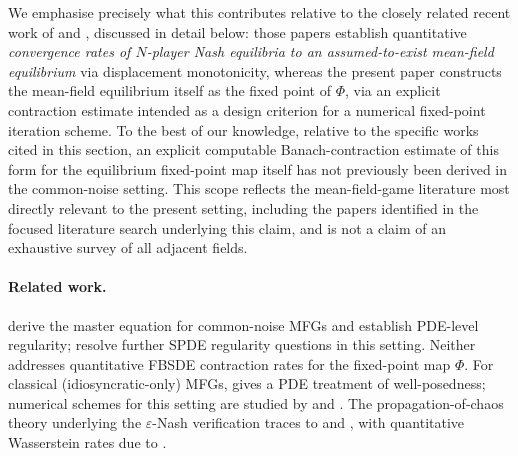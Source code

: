 \documentclass[11pt]{article}
\theoremstyle{remark}
\begin{document}
We emphasise precisely what this contributes relative to the closely related recent
work of \citet{jacksontangpi2024} and \citet{jacksonmeszaros2025}, discussed in detail
below: those papers establish quantitative \emph{convergence rates of $N$-player Nash
equilibria to an assumed-to-exist mean-field equilibrium} via displacement
monotonicity, whereas the present paper constructs the mean-field equilibrium itself
as the fixed point of $\Phi$, via an explicit contraction estimate intended as a
design criterion for a numerical fixed-point iteration scheme. To the best of our
knowledge, relative to the specific works cited in this section, an explicit
computable Banach-contraction estimate of this form for the equilibrium
fixed-point map itself has not previously been derived in the common-noise setting.
This scope reflects the mean-field-game literature most directly
relevant to the present setting, including the papers identified in the focused
literature search underlying this claim, and is not a claim of an exhaustive survey
of all adjacent fields.

\paragraph{Related work.} \citet{cardaliaguetetal2019} derive the master equation for
common-noise MFGs and
establish PDE-level regularity; \citet{cardaliaguetseegersouganidis2025} resolve
further SPDE regularity questions in this setting. Neither addresses quantitative
FBSDE contraction rates for the fixed-point map $\Phi$. For classical
(idiosyncratic-only) MFGs,
\citet{cardaliaguet2010notes} gives a PDE treatment of well-posedness; numerical
schemes for this setting are studied by \citet{achdoucapuzzo2010} and
\citet{carmonalauriere2022}. The propagation-of-chaos theory underlying the
$\varepsilon$-Nash verification traces to \citet{mckean1966} and
\citet{sznitman1991}, with quantitative Wasserstein rates due to
\citet{fournierguillin2015}.
\end{document}
